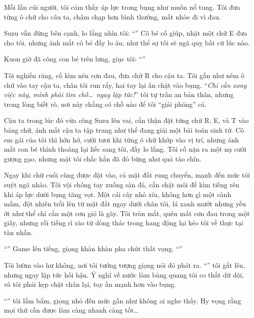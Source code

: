 \documentclass[../main.tex]{subfiles}
\begin{document}
Mỗi lần cúi người, tôi cảm thấy áp lực trong bụng như muốn nổ tung. Tôi đưa từng ô chữ cho câu ta, chậm chạp hơn bình thường, mắt nhòe đi vì đau.

Suzu vẫn đứng bên cạnh, lo lắng nhìn tôi: ``'' Cô bé cố giúp, nhặt một chữ E đưa cho tôi, nhưng ánh mắt cô bé đầy lo âu, như thể sợ tôi sẽ ngã quỵ bất cứ lúc nào.

Kuon giờ đã cõng con bé trên lưng, giục tôi: ``''

Tôi nghiến răng, cố kìm nén cơn đau, đưa chữ R cho cậu ta. Tôi gần như ném ô chữ vào tay cậu ta, chân tôi run rẩy, hai tay lại ấn chặt vào bụng. ``\textit{Chỉ cần xong việc này, mình phải tìm chỗ\dots\ ngay lập tức!}'' tôi tự trấn an bản thân, nhưng trong lòng biết rõ, nơi này chẳng có chỗ nào để tôi ``giải phóng'' cả.

Cậu ta trong lúc đó vừa cõng Suzu lên vai, cẩn thận đặt từng chữ R, E, và T vào bảng chữ, ánh mắt cậu ta tập trung như thể đang giải một bài toán sinh tử. Cô em gái của tôi thì hớn hở, cười tươi khi từng ô chữ khớp vào vị trí, nhưng ánh mắt con bé thỉnh thoảng lại liếc sang tôi, đầy lo lắng. Tôi cố nặn ra một nụ cười gượng gạo, nhưng mặt tôi chắc hẳn đã đỏ bừng như quả táo chín.

Ngay khi chữ cuối cùng được đặt vào, cả mặt đất rung chuyển, mạnh đến mức tôi suýt ngã nhào. Tôi vội chống tay xuống sàn đá, cắn chặt môi để kìm tiếng rên khi áp lực dưới bụng tăng vọt. Một cái cây nhỏ xíu, không hơn gì một cành mầm, đột nhiên trồi lên từ mặt đất ngay dưới chân tôi, lá xanh mướt nhưng yếu ớt như thể chỉ cần một cơn gió là gãy. Tôi tròn mắt, quên mất cơn đau trong một giây, nhưng rồi tiếng rì rào từ dòng thác trong hang động lại kéo tôi về thực tại tàn nhẫn.


``'' Game lên tiếng, giọng khàn khàn pha chút thất vọng. ``''

Tôi lườm vào hư không, nơi tôi tưởng tượng giọng nói đó phát ra. ``'' tôi gắt lên, nhưng ngay lập tức hối hận. Ý nghĩ về nước làm bàng quang tôi co thắt dữ dội, và tôi phải kẹp chặt chân lại, tay ấn mạnh hơn vào bụng.

``'' tôi lẩm bẩm, giọng nhỏ đến mức gần như không ai nghe thấy. Hy vọng rằng mọi thứ cần được làm càng nhanh càng tốt\dots
\end{document}
